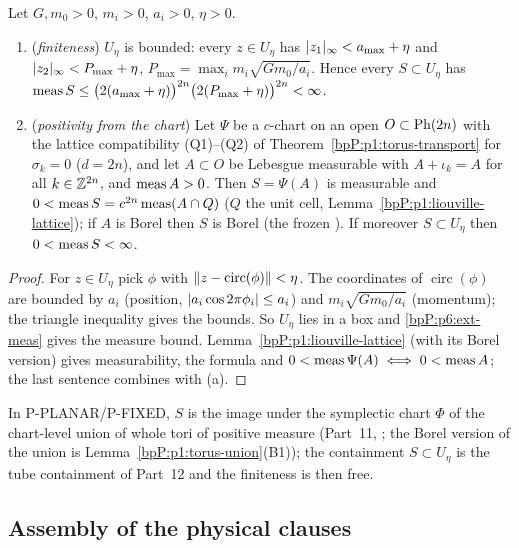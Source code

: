 \begin{lemma}\label{bpP:p6:measure-positive}
Let $G,m_0>0$, $m_i>0$, $a_i>0$, $\eta>0$.
\begin{enumerate}[label=(\alph*)]
\item (\emph{finiteness}) $U_\eta$ is bounded: every $z\in U_\eta$ has $\lvert z_1\rvert_\infty<a_{\max}+\eta$ and $\lvert z_2\rvert_\infty<P_{\max}+\eta$, $P_{\max}=\max_im_i\sqrt{Gm_0/a_i}$. Hence every $S\subset U_\eta$ has $\operatorname{meas} S\le\bigl(2(a_{\max}+\eta)\bigr)^{2n}\bigl(2(P_{\max}+\eta)\bigr)^{2n}<\infty$.
\item (\emph{positivity from the chart}) Let $\Psi$ be a $c$-chart on an open $O\subset\mathrm{Ph}(2n)$ with the lattice compatibility (Q1)--(Q2) of Theorem~\ref{bpP:p1:torus-transport} for $\sigma_k=0$ ($d=2n$), and let $A\subset O$ be Lebesgue measurable with $A+\iota_k=A$ for all $k\in\mathbb{Z}^{2n}$, and $\operatorname{meas} A>0$. Then $S=\Psi(A)$ is measurable and $0<\operatorname{meas} S=c^{2n}\operatorname{meas}(A\cap Q)$ ($Q$ the unit cell, Lemma~\ref{bpP:p1:liouville-lattice}); if $A$ is Borel then $S$ is Borel (the frozen ). If moreover $S\subset U_\eta$ then $0<\operatorname{meas} S<\infty$.
\end{enumerate}
\end{lemma}
\begin{proof}
\label{stepP:p6:mp-a} For $z\in U_\eta$ pick $\phi$ with $\lVert z-\operatorname{circ}(\phi)\rVert<\eta$. The coordinates of $\operatorname{circ}(\phi)$ are bounded by $a_i$ (position, $\lvert a_i\cos2\pi\phi_i\rvert\le a_i$) and $m_i\sqrt{Gm_0/a_i}$ (momentum); the triangle inequality gives the bounds. So $U_\eta$ lies in a box and \ref{bpP:p6:ext-meas} gives the measure bound.
\label{stepP:p6:mp-b} Lemma~\ref{bpP:p1:liouville-lattice} (with its Borel version) gives measurability, the formula and $0<\operatorname{meas}\Psi(A)\iff0<\operatorname{meas} A$; the last sentence combines with (a).
\end{proof}
\begin{remark}[Use]\label{bpP:p6:mp-use}
In P-PLANAR/P-FIXED, $S$ is the image under the symplectic chart $\Phi$ of the chart-level union of whole tori of positive measure (Part~11, ; the Borel version of the union is Lemma~\ref{bpP:p1:torus-union}(B1)); the containment $S\subset U_\eta$ is the tube containment of Part~12 and the finiteness is then free.
\end{remark}

\subsection{Assembly of the physical clauses}\label{bpP:p6:assembly}

